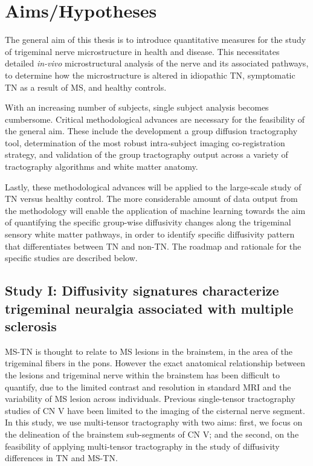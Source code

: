 \chapter{Aims/Hypotheses}

The general aim of this thesis is to introduce quantitative measures for the study of trigeminal nerve microstructure in health and disease. This necessitates detailed \textit{in-vivo} microstructural analysis of the nerve and its associated pathways, to determine how the microstructure is altered in idiopathic TN, symptomatic TN as a result of MS, and healthy controls. 

With an increasing number of subjects, single subject analysis becomes cumbersome. Critical methodological advances are necessary for the feasibility of the general aim. These include the development a group diffusion tractography tool, determination of the most robust intra-subject imaging co-registration strategy, and validation of the group tractography output across a variety of tractography algorithms and white matter anatomy. 

Lastly, these methodological advances will be applied to the large-scale study of TN versus healthy control.  The more considerable amount of data output from the methodology will enable the application of machine learning towards the aim of quantifying the specific group-wise diffusivity changes along the trigeminal sensory white matter pathways, in order to identify specific diffusivity pattern that differentiates between TN and non-TN. The roadmap and rationale for the specific studies are described below.

\section{Study I: Diffusivity signatures characterize trigeminal neuralgia associated with multiple sclerosis}
MS-TN is thought to relate to MS lesions in the brainstem, in the area of the trigeminal fibers in the pons. However the exact anatomical relationship between the lesions and trigeminal nerve within the brainstem has been difficult to quantify, due to the limited contrast and resolution in standard MRI and the variability of MS lesion across individuals. Previous single-tensor tractography studies of CN V have been limited to the imaging of the cisternal nerve segment. In this study, we use multi-tensor tractography with two aims: first, we focus on the delineation of the brainstem sub-segments of CN V; and the second, on the feasibility of applying multi-tensor tractography in the study of diffusivity differences in TN and MS-TN. 

